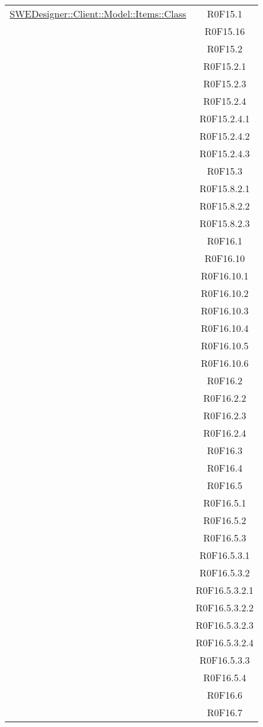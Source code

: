 \documentclass[../DefinizioneDiProdotto.tex]{subfiles}
\begin{document}
\begin{longtable}{|c|c|}
				\hyperlink{SWEDesigner::Client::Model::Items::Class}{SWEDesigner::Client::Model::Items::Class}
				& R0F15.1\\
				& R0F15.16\\
				& R0F15.2\\
				& R0F15.2.1\\
				& R0F15.2.3\\
				& R0F15.2.4\\
				& R0F15.2.4.1\\
				& R0F15.2.4.2\\
				& R0F15.2.4.3\\
				& R0F15.3\\
				& R0F15.8.2.1\\
				& R0F15.8.2.2\\
				& R0F15.8.2.3\\
				& R0F16.1\\
				& R0F16.10\\
				& R0F16.10.1\\
				& R0F16.10.2\\
				& R0F16.10.3\\
				& R0F16.10.4\\
				& R0F16.10.5\\
				& R0F16.10.6\\
				& R0F16.2\\
				& R0F16.2.2\\
				& R0F16.2.3\\
				& R0F16.2.4\\
				& R0F16.3\\
				& R0F16.4\\
				& R0F16.5\\
				& R0F16.5.1\\
				& R0F16.5.2\\
				& R0F16.5.3\\
				& R0F16.5.3.1\\
				& R0F16.5.3.2\\
				& R0F16.5.3.2.1\\
				& R0F16.5.3.2.2\\
				& R0F16.5.3.2.3\\
				& R0F16.5.3.2.4\\
				& R0F16.5.3.3\\
				& R0F16.5.4\\
				& R0F16.6\\
				& R0F16.7\\
				\hline


\end{longtable}
\end{document}
